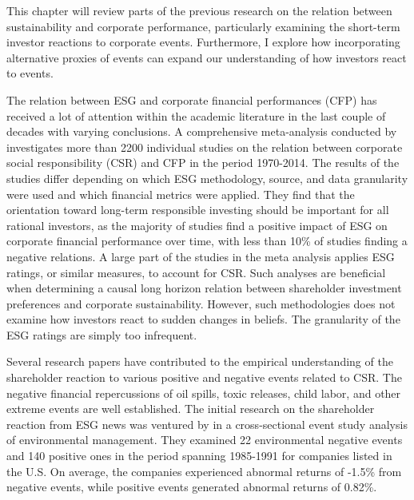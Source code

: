 
This chapter will review parts of the previous research on the relation between sustainability and corporate performance, particularly examining the short-term investor reactions to corporate events. Furthermore, I explore how incorporating alternative proxies of events can expand our understanding of how investors react to events.

The relation between ESG and corporate financial performances (CFP) has received a lot of attention within the academic literature in the last couple of decades with varying conclusions. A comprehensive meta-analysis conducted by \cite{ESG_meta_analysis} investigates more than 2200 individual studies on the relation between corporate social responsibility (CSR) and CFP in the period 1970-2014. The results of the studies differ depending on which ESG methodology, source, and data granularity were used and which financial metrics were applied. They find that the orientation toward long-term responsible investing should be important for all rational investors, as the majority of studies find a positive impact of ESG on corporate financial performance over time, with less than 10\% of studies finding a negative relations. A large part of the studies in the meta analysis applies ESG ratings, or similar measures, to account for CSR. Such analyses are beneficial when determining a causal long horizon relation between shareholder investment preferences and corporate sustainability. However, such methodologies does not examine how investors react to sudden changes in beliefs. The granularity of the ESG ratings are simply too infrequent. 

Several research papers have contributed to the empirical understanding of the shareholder reaction to various positive and negative events related to CSR. The negative financial repercussions of oil spills, toxic releases, child labor, and other extreme events are well established. The initial research on the shareholder reaction from ESG news was ventured by \cite{klassen1996impact} in a cross-sectional event study analysis of environmental management. They examined 22 environmental negative events and 140 positive ones in the period spanning 1985-1991 for companies listed in the U.S. On average, the companies experienced abnormal returns of -1.5\% from negative events, while positive events generated abnormal returns of 0.82\%. 


